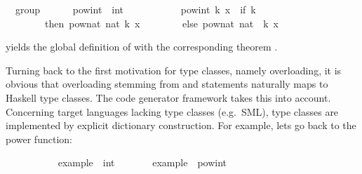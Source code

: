 \begin{isabellebody}
\ {\isacharparenleft}\ group{\isacharparenright}\isanewline
\ \ \ \ \ \ pow{\isacharunderscore}int\ {\isacharcolon}{\isacharcolon}\ {\isachardoublequoteopen}int\ {\isasymRightarrow}\ {\isasymalpha}\ {\isasymRightarrow}\ {\isasymalpha}{\isachardoublequoteclose}\ \isanewline
\ \ \ \ \ \ {\isachardoublequoteopen}pow{\isacharunderscore}int\ k\ x\ {\isacharequal}\ {\isacharparenleft}if\ k\ {\isachargreater}{\isacharequal}\ {}\isanewline
\ \ \ \ \ \ \ \ then\ pow{\isacharunderscore}nat\ {\isacharparenleft}nat\ k{\isacharparenright}\ x\isanewline
\ \ \ \ \ \ \ \ else\ {\isacharparenleft}pow{\isacharunderscore}nat\ {\isacharparenleft}nat\ {\isacharparenleft}{\isacharminus}\ k{\isacharparenright}{\isacharparenright}\ x{\isacharparenright}{\isasymdiv}{\isacharparenright}{\isachardoublequoteclose}%
\begin{isamarkuptext}%
\noindent   yields the global definition of
  with the corresponding theorem .%
\end{isamarkuptext}%
\isamarkuptrue%
%
\isamarkuptrue%
%
\isamarkuptrue%
%
\begin{isamarkuptext}%
Turning back to the first motivation for type classes,
  namely overloading, it is obvious that overloading
  stemming from \isa{{\isasymCLASS}} and \isa{{\isasymINSTANCE}}
  statements naturally maps to Haskell type classes.
  The code generator framework \cite{isabelle-codegen} 
  takes this into account.  Concerning target languages
  lacking type classes (e.g.~SML), type classes
  are implemented by explicit dictionary construction.
  For example, lets go back to the power function:%
\end{isamarkuptext}%
\isamarkuptrue%
\ \ \ \ \isamarkupfalse%
\isanewline
\ \ \ \ \ \ example\ {\isacharcolon}{\isacharcolon}\ int\ \isanewline
\ \ \ \ \ \ {\isachardoublequoteopen}example\ {\isacharequal}\ pow{\isacharunderscore}int\ {}{}\ {\isacharparenleft}{\isacharminus}{}{\isacharparenright}{\isachardoublequoteclose}%

\end{isabellebody}
